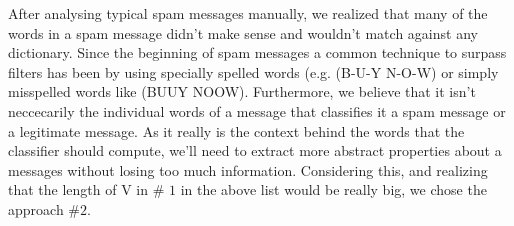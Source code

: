 After analysing typical spam messages manually, we realized that many of the
words in a spam message didn't make sense and wouldn't match against any
dictionary. Since the beginning of spam messages a common technique to surpass
filters has been by using specially spelled words (e.g. (B-U-Y N-O-W) or simply
misspelled words like (BUUY NOOW). \cite{machine-learning-methods-spam}
Furthermore, we believe that it isn't neccecarily the individual words of a
message that classifies it a spam message or a legitimate message. As it really
is the context behind the words that the classifier should compute, we'll
need to extract more abstract properties about a messages without losing too
much information.
Considering this, and realizing that the length of V in \# $1$ in the above list
would be really big, we chose the approach \#$2$.
